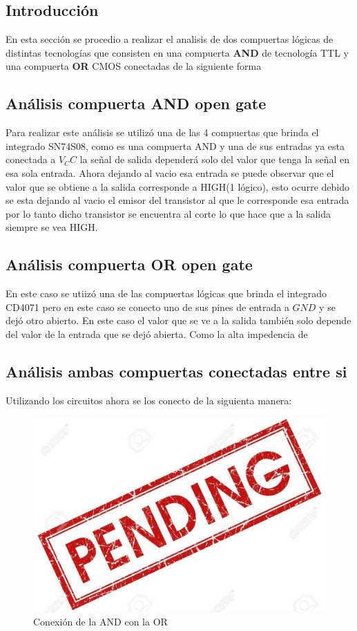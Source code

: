 \documentclass[a4paper]{article}
\begin{document}
\subsection{Introducción}
En esta sección se procedio a realizar el analisis de dos compuertas lógicas de distintas tecnologías que consisten en una compuerta \textbf{AND} de tecnología TTL y una compuerta \textbf{OR} CMOS conectadas de la siguiente forma

\subsection{Análisis compuerta AND open gate}
Para realizar este análisis se utilizó una de las 4 compuertas que brinda el integrado SN74S08, como es una compuerta AND y una de sus entradas ya esta conectada a $ V_CC $ la señal de salida dependerá solo del valor que tenga la señal en esa sola entrada. Ahora dejando al vacio esa entrada se puede observar que el valor que se obtiene a la salida corresponde a HIGH(1 lógico), esto ocurre debido se esta dejando al vacio el emisor del transistor al que le corresponde esa entrada por lo tanto dicho transistor se encuentra al corte lo que hace que a la salida siempre se vea HIGH.

\subsection{Análisis compuerta OR open gate}
En este caso se utiizó una de las compuertas lógicas que brinda el integrado CD4071 pero en este caso se conecto uno de sus pines de entrada a $ GND $ y se dejó otro abierto. En este caso el valor que se ve a la salida también solo depende del valor de la entrada que se dejó abierta. Como la alta impedencia de

\subsection{Análisis ambas compuertas conectadas entre si}
Utilizando los circuitos ahora se los conecto de la siguienta manera:
\begin{figure}[h]
    \centering
    \includegraphics{Imagenes/pend.jpg}
    \caption{Conexión de la AND con la OR}
\end{figure}
\end{document}
